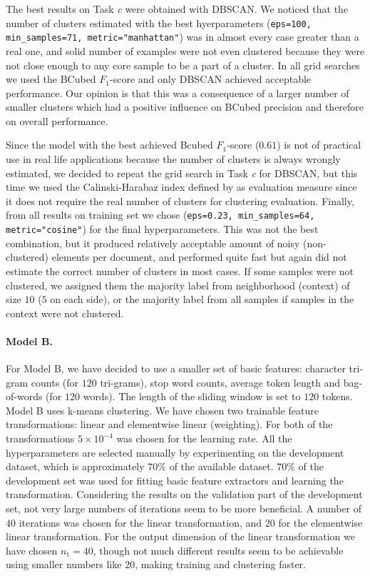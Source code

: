 \documentclass[10pt, a4paper]{article}
\begin{document}
The best results on Task \emph{c} were obtained with DBSCAN. We noticed that the number of clusters  estimated with the best hyerparameters (\texttt{eps=100, min\_samples=71, metric="manhattan"}) was in almost every case greater than a real one, and solid number of examples were not even clustered because they were not close enough to any core sample to be a part of a cluster. In all grid searches we used the BCubed $F_1$-score and only DBSCAN achieved acceptable performance. Our opinion is that this was a consequence of a larger number of smaller clusters which had a positive influence on BCubed precision and therefore on overall performance.
 
Since the model with the best achieved Bcubed $F_1$-score ($0.61$) is not of practical use in real life applications because the number of clusters is always wrongly estimated, we decided to repeat the grid search in Task \emph{c} for DBSCAN, but this time we used the Calinski-Harabaz index defined by \citet{calinski-1974} as evaluation measure since it does not require the real number of clusters for clustering evaluation. Finally, from all results on training set we chose (\texttt{eps=0.23, min\_samples=64, metric="cosine"}) for the final hyperparameters. This was not the best combination, but it produced relatively acceptable amount of noisy (non-clustered) elements per document, and performed quite fast but again did not estimate the correct number of clusters in most cases. If some samples were not clustered, we assigned them the majority label from neighborhood (context) of size $10$ ($5$ on each side), or the majority label from all samples if samples in the context were not clustered.

\paragraph{Model B.} For Model B, we have decided to use a smaller set of basic features: character tri-gram counts (for $120$ tri-grams), stop word counts, average token length and bag-of-words (for $120$ words). The length of the sliding window is set to $120$ tokens. Model B uses k-means clustering. We have chosen two trainable feature transformations: linear and elementwise linear (weighting). For both of the transformations $5\times 10^{-4}$ was chosen for the learning rate. All the hyperparameters are selected manually by experimenting on the development dataset, which is approximately $70\%$ of the available dataset. $70\%$ of the development set was used for fitting basic feature extractors and learning the transformation. Considering the results on the validation part of the development set, not very large numbers of iterations seem to be more beneficial. A number of $40$ iterations was chosen for the linear transformation, and $20$ for the elementwise linear transformation. For the output dimension of the linear transformation we have chosen $n_\mathrm{t}=40$, though not much different results seem to be achievable using smaller numbers like $20$, making training and clustering faster.
\end{document}
